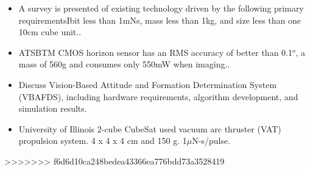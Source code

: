 \begin{itemize}
\item A survey is presented of existing technology driven by the following primary requirementsIbit less than 1mNs, mass less than 1kg, and size less than one 10cm cube unit.\cite{Ref:Storck06}. 

\item ATSBTM CMOS horizon sensor has an RMS accuracy of better than 0.1$^o$, a mass of 560g and consumes only 550mW when imaging.\cite{Ref:Bahar06}. 

\item Discuss Vision-Based Attitude and Formation Determination System (VBAFDS), including hardware requirements, algorithm development, and simulation results\cite{Ref:Rogers04}. 

\item University of Illinois 2-cube CubeSat used vacuum arc thruster (VAT) propulsion system.  4 x 4 x 4 cm and 150 g.  1$\mu$N-s/pulse\cite{Ref:Rysanek02}. 
\end{itemize}




%
%

%
>>>>>>> f6d6d10ca248bedea43366ea776bdd73a3528419
